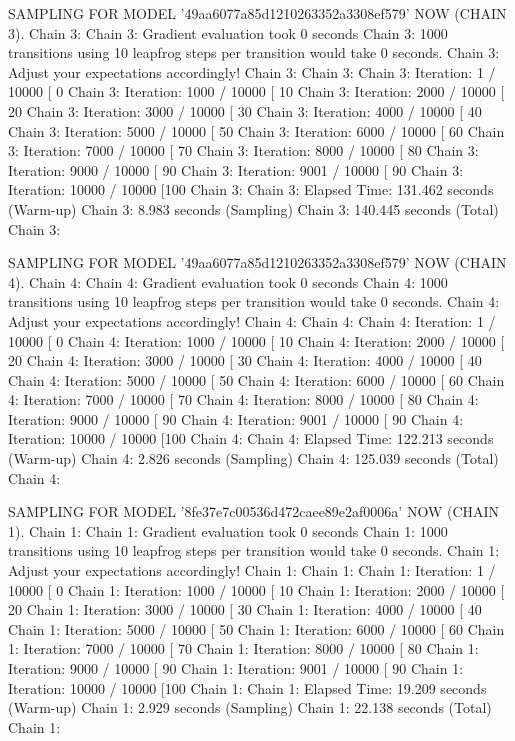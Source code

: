 \documentclass[
]{jss}
\begin{document}
\begin{CodeChunk}
\begin{CodeOutput}
SAMPLING FOR MODEL '49aa6077a85d1210263352a3308ef579' NOW (CHAIN 3).
Chain 3: 
Chain 3: Gradient evaluation took 0 seconds
Chain 3: 1000 transitions using 10 leapfrog steps per transition would take 0 seconds.
Chain 3: Adjust your expectations accordingly!
Chain 3: 
Chain 3: 
Chain 3: Iteration:    1 / 10000 [  0%
Chain 3: Iteration: 1000 / 10000 [ 10%
Chain 3: Iteration: 2000 / 10000 [ 20%
Chain 3: Iteration: 3000 / 10000 [ 30%
Chain 3: Iteration: 4000 / 10000 [ 40%
Chain 3: Iteration: 5000 / 10000 [ 50%
Chain 3: Iteration: 6000 / 10000 [ 60%
Chain 3: Iteration: 7000 / 10000 [ 70%
Chain 3: Iteration: 8000 / 10000 [ 80%
Chain 3: Iteration: 9000 / 10000 [ 90%
Chain 3: Iteration: 9001 / 10000 [ 90%
Chain 3: Iteration: 10000 / 10000 [100%
Chain 3: 
Chain 3:  Elapsed Time: 131.462 seconds (Warm-up)
Chain 3:                8.983 seconds (Sampling)
Chain 3:                140.445 seconds (Total)
Chain 3: 

SAMPLING FOR MODEL '49aa6077a85d1210263352a3308ef579' NOW (CHAIN 4).
Chain 4: 
Chain 4: Gradient evaluation took 0 seconds
Chain 4: 1000 transitions using 10 leapfrog steps per transition would take 0 seconds.
Chain 4: Adjust your expectations accordingly!
Chain 4: 
Chain 4: 
Chain 4: Iteration:    1 / 10000 [  0%
Chain 4: Iteration: 1000 / 10000 [ 10%
Chain 4: Iteration: 2000 / 10000 [ 20%
Chain 4: Iteration: 3000 / 10000 [ 30%
Chain 4: Iteration: 4000 / 10000 [ 40%
Chain 4: Iteration: 5000 / 10000 [ 50%
Chain 4: Iteration: 6000 / 10000 [ 60%
Chain 4: Iteration: 7000 / 10000 [ 70%
Chain 4: Iteration: 8000 / 10000 [ 80%
Chain 4: Iteration: 9000 / 10000 [ 90%
Chain 4: Iteration: 9001 / 10000 [ 90%
Chain 4: Iteration: 10000 / 10000 [100%
Chain 4: 
Chain 4:  Elapsed Time: 122.213 seconds (Warm-up)
Chain 4:                2.826 seconds (Sampling)
Chain 4:                125.039 seconds (Total)
Chain 4: 

SAMPLING FOR MODEL '8fe37e7c00536d472caee89e2af0006a' NOW (CHAIN 1).
Chain 1: 
Chain 1: Gradient evaluation took 0 seconds
Chain 1: 1000 transitions using 10 leapfrog steps per transition would take 0 seconds.
Chain 1: Adjust your expectations accordingly!
Chain 1: 
Chain 1: 
Chain 1: Iteration:    1 / 10000 [  0%
Chain 1: Iteration: 1000 / 10000 [ 10%
Chain 1: Iteration: 2000 / 10000 [ 20%
Chain 1: Iteration: 3000 / 10000 [ 30%
Chain 1: Iteration: 4000 / 10000 [ 40%
Chain 1: Iteration: 5000 / 10000 [ 50%
Chain 1: Iteration: 6000 / 10000 [ 60%
Chain 1: Iteration: 7000 / 10000 [ 70%
Chain 1: Iteration: 8000 / 10000 [ 80%
Chain 1: Iteration: 9000 / 10000 [ 90%
Chain 1: Iteration: 9001 / 10000 [ 90%
Chain 1: Iteration: 10000 / 10000 [100%
Chain 1: 
Chain 1:  Elapsed Time: 19.209 seconds (Warm-up)
Chain 1:                2.929 seconds (Sampling)
Chain 1:                22.138 seconds (Total)
Chain 1: 


\end{CodeOutput}
\end{CodeChunk}
\end{document}
